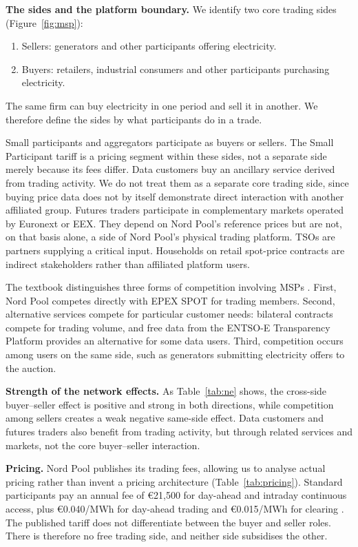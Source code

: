 \textbf{The sides and the platform boundary.} We identify two core trading sides (Figure~\ref{fig:msp}):
\begin{enumerate}
  \item Sellers: generators and other participants offering electricity.
  \item Buyers: retailers, industrial consumers and other participants purchasing electricity.
\end{enumerate}
The same firm can buy electricity in one period and sell it in another. We therefore define the sides by what participants do in a trade.

Small participants and aggregators participate as buyers or sellers. The Small Participant tariff is a pricing segment within these sides, not a separate side merely because its fees differ. Data customers buy an ancillary service derived from trading activity. We do not treat them as a separate core trading side, since buying price data does not by itself demonstrate direct interaction with another affiliated group. Futures traders participate in complementary markets operated by Euronext or EEX. They depend on Nord Pool's reference prices but are not, on that basis alone, a side of Nord Pool's physical trading platform. TSOs are partners supplying a critical input. Households on retail spot-price contracts are indirect stakeholders rather than affiliated platform users.

The textbook distinguishes three forms of competition involving MSPs \citep[Section~10.2.3]{OverbyAudestad2021}. First, Nord Pool competes directly with EPEX SPOT for trading members. Second, alternative services compete for particular customer needs: bilateral contracts compete for trading volume, and free data from the ENTSO-E Transparency Platform provides an alternative for some data users. Third, competition occurs among users on the same side, such as generators submitting electricity offers to the auction.

\textbf{Strength of the network effects.} As Table~\ref{tab:ne} shows, the cross-side buyer--seller effect is positive and strong in both directions, while competition among sellers creates a weak negative same-side effect. Data customers and futures traders also benefit from trading activity, but through related services and markets, not the core buyer--seller interaction.



\textbf{Pricing.} Nord Pool publishes its trading fees, allowing us to analyse actual pricing rather than invent a pricing architecture (Table~\ref{tab:pricing}). Standard participants pay an annual fee of €21,500 for day-ahead and intraday continuous access, plus €0.040/MWh for day-ahead trading and €0.015/MWh for clearing \citep{NPFees2026}. The published tariff does not differentiate between the buyer and seller roles. There is therefore no free trading side, and neither side subsidises the other.

